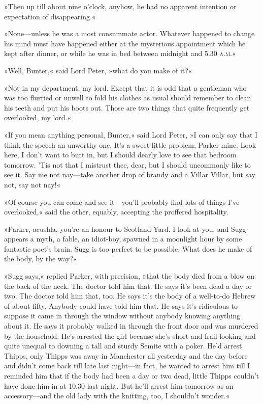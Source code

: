 »Then up till about nine o'clock, anyhow, he had no apparent intention or expectation of disappearing.«

»None—unless he was a most consummate actor. Whatever happened to change his mind must have happened either at the mysterious appointment which he kept after dinner, or while he was in bed between midnight and 5.30 \textsc{a.m.}«

»Well, Bunter,« said Lord Peter, »what do you make of it?«

»Not in my department, my lord. Except that it is odd that a gentleman who was too flurried or unwell to fold his clothes as usual should remember to clean his teeth and put his boots out. Those are two things that quite frequently get overlooked, my lord.«

»If you mean anything personal, Bunter,« said Lord Peter, »I can only say that I think the speech an unworthy one. It's a sweet little problem, Parker mine. Look here, I don't want to butt in, but I should dearly love to see that bedroom tomorrow. 'Tis not that I mistrust thee, dear, but I should uncommonly like to see it. Say me not nay—take another drop of brandy and a Villar Villar, but say not, say not nay!«

»Of course you can come and see it—you'll probably find lots of things I've overlooked,« said the other, equably, accepting the proffered hospitality.

»Parker, acushla, you're an honour to Scotland Yard. I look at you, and Sugg appears a myth, a fable, an idiot-boy, spawned in a moonlight hour by some fantastic poet's brain. Sugg is too perfect to be possible. What does he make of the body, by the way?«

»Sugg says,« replied Parker, with precision, »that the body died from a blow on the back of the neck. The doctor told him that. He says it's been dead a day or two. The doctor told him that, too. He says it's the body of a well-to-do Hebrew of about fifty. Anybody could have told him that. He says it's ridiculous to suppose it came in through the window without anybody knowing anything about it. He says it probably walked in through the front door and was murdered by the household. He's arrested the girl because she's short and frail-looking and quite unequal to downing a tall and sturdy Semite with a poker. He'd arrest Thipps, only Thipps was away in Manchester all yesterday and the day before and didn't come back till late last night—in fact, he wanted to arrest him till I reminded him that if the body had been a day or two dead, little Thipps couldn't have done him in at 10.30 last night. But he'll arrest him tomorrow as an accessory—and the old lady with the knitting, too, I shouldn't wonder.«


